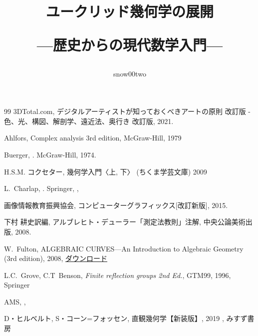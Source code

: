 \documentclass[book, paper=a4paper, 12pt]{jlreq}
\title{ユークリッド幾何学の展開\par \normalsize{---歴史からの現代数学入門---}}
\author{snow00two}
\theoremstyle{definition}
\theoremstyle{remark}
\begin{document}
\maketitle

\frontmatter


\tableofcontents

\mainmatter







\appendix



% 

\backmatter

\begin{thebibliography}{99}
         3DTotal.com, 
         デジタルアーティストが知っておくべきアートの原則 改訂版 -色、光、構図、解剖学、遠近法、奥行き 改訂版, 
         2021.
      
 Ahlfors, Complex analysis 3rd edition, McGraw-Hill, 1979

Buerger,
.
\newblock  McGraw-Hill, 1974.

H.S.M. コクセター, 幾何学入門〈上, 下〉 (ちくま学芸文庫) 2009 

L.~Charlap, 
.
\newblock  Springer,
, 

         画像情報教育振興協会, コンピューターグラフィックス[改訂新版], 2015.
      
         下村 耕史訳編, アルブレヒト・デューラー「測定法教則」注解, 中央公論美術出版, 2008.


   W.~Fulton, 
   ALGEBRAIC CURVES---An Introduction to Algebraic Geometry (3rd edition), 2008, 
   \href{https://dept.math.lsa.umich.edu/~wfulton/CurveBook.pdf}{ダウンロード}

   L.C.~Grove, C.T~Benson, \textit{Finite reflection groups 2nd Ed.}, GTM99, 1996, Springer
   
AMS,
, 

D・ヒルベルト, S・コーン=フォッセン, 直観幾何学【新装版】, 2019 , 
みすず書房 %


\end{thebibliography}
\end{document}
